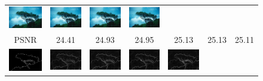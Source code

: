 \documentclass[10pt,twocolumn,letterpaper]{article}
\begin{document}
\begin{figure} [tb]
\begin{tabular*}{0.5\textwidth}{ccccccc}
  \includegraphics[width=2cm]{fig/147091[4-ANR]_g.jpg} & \hspace{-4mm}
  \includegraphics[width=2cm]{fig/147091[5-SRCNN]_g.jpg} & \hspace{-4mm}
  \includegraphics[width=2cm]{fig/147091[6-A+]_g.jpg} & \hspace{-4mm}
  \includegraphics[width=2cm]{fig/147091[7-JOR]_g.jpg} \\
  PSNR & 24.41 & 24.93 & 24.95 & 25.13 & 25.13 & 25.11\\       
  \hspace{-2mm}
  \includegraphics[width=2cm]{fig/147091_seg.jpg} & \hspace{-4mm}
  \includegraphics[width=2cm]{fig/147091[2-Bicubic]_crisp.jpg} & \hspace{-4mm}
  \includegraphics[width=2cm]{fig/147091[3-Zeyde]_crisp.jpg} & \hspace{-4mm}
  \includegraphics[width=2cm]{fig/147091[4-ANR]_crisp.jpg} & \hspace{-4mm}
  \includegraphics[width=2cm]{fig/147091[5-SRCNN]_crisp.jpg} & \hspace{-4mm}

\end{tabular*}
\end{figure}
\end{document}

